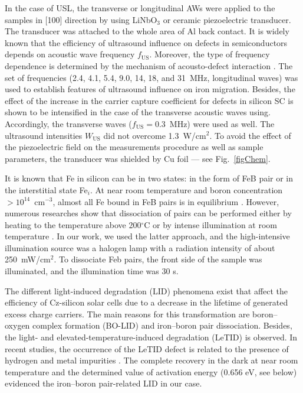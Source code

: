 \documentclass[sn-mathphys]{sn-jnl}%
\theoremstyle{thmstyleone}%
\theoremstyle{thmstyletwo}%
\theoremstyle{thmstylethree}%
\begin{document}
In the case of USL, the transverse or longitudinal AWs
were applied to the samples in [100] direction by using LiNbO$_3$ or ceramic piezoelectric transducer.
The transducer was attached to the whole area of Al back contact.
It is widely known that the efficiency of ultrasound influence on
defects in semiconductors depends on acoustic wave frequency $f_\mathrm{US}$.
Moreover, the type of frequency dependence is determined by the mechanism of acousto-defect
interaction \cite{Brailsford,Pavlovich,PeleshchakUJF2016}.
The set of frequencies (2.4, 4.1, 5.4, 9.0, 14, 18, and 31~MHz, longitudinal waves)
was used  to establish features of
ultrasound influence on iron migration.
Besides,  the effect of the increase in the carrier capture coefficient for defects in silicon SC
is shown \cite{Olikh2018SM} to be intensified in the case of the transverse acoustic waves using.
Accordingly, the transverse waves ($f_\mathrm{US}=0.3$~MHz) were used as well.
The ultrasound intensities $W_\mathrm{US}$  did not overcome 1.3~W/cm$^2$.
To avoid the effect of the piezoelectric field on the measurements procedure as well as sample parameters,
the transducer was shielded by Cu foil --- see Fig.~\ref{figChem}.

It is known that Fe in silicon can be in two states:
in the form of FeB pair or in the interstitial state Fe$_i$.
At near room temperature and boron concentration $>10^{14}$~cm$^{-3}$,
almost all Fe bound in FeB pairs is in equilibrium \cite{FeB:kinetic,FeBAssJAP2014,FeBAssSST2011,FeBJAP2005}.
However, numerous researches show that dissociation of pairs can be performed either by heating to the temperature above 200$^\circ$C
or by intense illumination at room temperature \cite{FeBAssJAP2014,FeBJAP2005}.
In our work, we used the latter approach,
and the high-intensive illumination source was a halogen lamp
with a radiation intensity of about 250~mW/cm$^2$.
To dissociate Feb pairs, the front side of the sample was illuminated, and the illumination time was  30 s.

The different light-induced degradation (LID) phenomena exist that affect the efficiency
of Cz-silicon solar cells due to a decrease in the lifetime of generated excess charge carriers.
The main reasons for this transformation are boron--oxygen complex formation (BO-LID) \cite{LIDRev} and
iron--boron pair dissociation.
Besides, the light- and elevated-temperature-induced degradation (LeTID) is observed.
In recent studies, the occurrence of the LeTID defect is related
to the presence of hydrogen and metal impurities \cite{LeTID_H,LeTID_Me,LeTID_Me2}.
The complete  recovery in the dark at near room temperature and the determined value
of activation energy (0.656 eV, see below) evidenced the iron--boron pair-related LID in our case.
\end{document}
